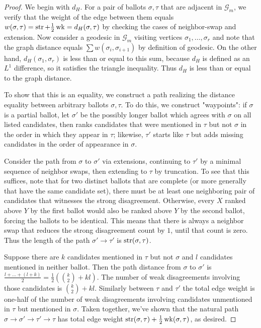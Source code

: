 \documentclass{amsart}
\newcommand{\G}{\mathcal{G}}
\newcommand{\str}{\mathop{\rm str}}
\newcommand{\wk}{\mathop{\rm wk}}
\theoremstyle{plain}
\theoremstyle{definition}
\theoremstyle{remark}
\begin{document}
\begin{proof} We begin with $d_H$.  For a pair of ballots $\sigma,\tau$ that are adjacent in $\G_m$, we verify that the weight of the edge between them equals 
$w(\sigma, \tau) =\str+\frac 12 \wk = d_H(\sigma,\tau)$ by checking the cases of neighbor-swap and extension.  Now  consider a geodesic in $\G_m$ visiting vertices $\sigma_1,\dots,\sigma_r$ and note that 
the graph distance equals $\sum w(\sigma_i,\sigma_{i+1})$ by definition of geodesic.  On the other hand, $d_H(\sigma_1,\sigma_r)$ is less than or equal to this sum, because $d_H$ is defined as an $L^1$ difference, so it satisfies the triangle inequality.  Thus $d_H$ is less than or equal to  the graph distance.

To show that this is an equality, we construct a path realizing the distance equality between arbitrary ballots $\sigma,\tau$.
To do this, we construct "waypoints":  if $\sigma$ is a partial ballot, let $\sigma'$ be the possibly longer ballot which agrees with $\sigma$ on all listed candidates, then ranks candidates that were mentioned in $\tau$ but not $\sigma$ in the order in which they appear in $\tau$; likewise, $\tau'$ starts like $\tau$ but adds missing candidates in the order of appearance in $\sigma$.  

Consider the path from $\sigma$ to $\sigma'$ via extensions, continuing to $\tau'$ by a minimal sequence of neighbor swaps, then extending to $\tau$ by truncation.
To see that this suffices, note that for two distinct ballots that are complete (or more generally that have the same candidate set), there must be at least one neighboring pair of candidates that witnesses the strong disagreement.  Otherwise, every $X$ ranked above $Y$ by the first ballot would also be ranked above $Y$ by the second ballot, forcing the ballots to be identical.  This means that there is always a neighbor swap that reduces the strong disagreement count by $1$, until that count is zero.  Thus the length of the path $\sigma'\rightarrow\tau'$ is $\str(\sigma,\tau)$.  

Suppose there are $k$ candidates mentioned in $\tau$ but not $\sigma$ and $l$ candidates mentioned in neither ballot.
Then the path distance from $\sigma$ to $\sigma'$
is  $\frac{l+\dots+(l+k)}{2}= \frac 12 \left(\binom{k}{2}+kl\right)$.
The number of weak disagreements involving those candidates is $\binom{k}{2} + kl$.  Similarly between $\tau$ and $\tau'$ the total edge weight is one-half of the number of weak disagreements involving candidates unmentioned in $\tau$ but mentioned in $\sigma$.  
Taken together, we've shown that the natural path $\sigma\to\sigma'\to\tau'\to\tau$ has total edge weight $\str(\sigma,\tau)+\frac 12 \wk(\sigma,\tau)$, as desired.  


\end{proof}
\end{document}
